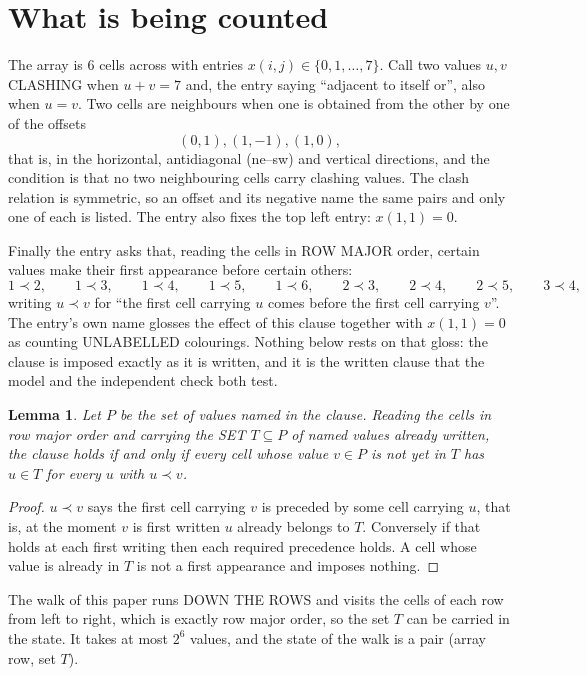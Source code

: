 \documentclass[11pt,a4paper]{article}
\theoremstyle{plain}
\newtheorem{lemma}[theorem]{Lemma}
\theoremstyle{definition}
\begin{document}
\section{What is being counted}

The array is $6$ cells across with entries $x(i,j)\in\{0,1,\dots,7\}$. Call two values $u,v$ CLASHING
when $u+v=7$ and, the entry saying ``adjacent to itself or'', also when $u=v$. Two cells are neighbours when one is obtained from the other by one of
the offsets
\[
(0,1), (1,-1), (1,0),
\]
that is, in the horizontal, antidiagonal (ne--sw) and vertical directions, and the condition is that no two neighbouring cells carry
clashing values. The clash relation is symmetric, so an offset and its negative name the
same pairs and only one of each is listed. The entry also fixes the top left entry: $x(1,1)=0$.

Finally the entry asks that, reading the cells in ROW MAJOR order, certain values make their
first appearance before certain others:
\[
1\prec 2,\qquad 1\prec 3,\qquad 1\prec 4,\qquad 1\prec 5,\qquad 1\prec 6,\qquad 2\prec 3,\qquad 2\prec 4,\qquad 2\prec 5,\qquad 3\prec 4 ,
\]
writing $u\prec v$ for ``the first cell carrying $u$ comes before the first cell carrying
$v$''. The entry's own name glosses the effect of this clause together with $x(1,1)=0$ as
counting UNLABELLED colourings. Nothing below rests on that gloss: the clause is imposed
exactly as it is written, and it is the written clause that the model and the independent
check both test.

\begin{lemma}\label{lem:seen}
Let $P$ be the set of values named in the clause. Reading the cells in row major order and
carrying the SET $T\subseteq P$ of named values already written, the clause holds if and only
if every cell whose value $v\in P$ is not yet in $T$ has $u\in T$ for every $u$ with $u\prec v$.
\end{lemma}

\begin{proof}
$u\prec v$ says the first cell carrying $v$ is preceded by some cell carrying $u$, that is, at
the moment $v$ is first written $u$ already belongs to $T$. Conversely if that holds at each
first writing then each required precedence holds. A cell whose value is already in $T$ is not
a first appearance and imposes nothing.
\end{proof}

The walk of this paper runs DOWN THE ROWS and visits the cells of each row from left to right,
which is exactly row major order, so the set $T$ can be carried in the state. It takes at most
$2^{6}$ values, and the state of the walk is a pair (array row, set $T$).
\end{document}
